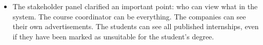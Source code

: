 \documentclass{l3deliverable}
\begin{document}
\begin{itemize}
\item The stakeholder panel clarified an important point: who can view what
in the system. The course coordinator can be everything. The companies can see
their own advertisements. The students can see all published internships, even
if they have been marked as unsuitable for the student's degree.

\end{itemize}

\end{document}
